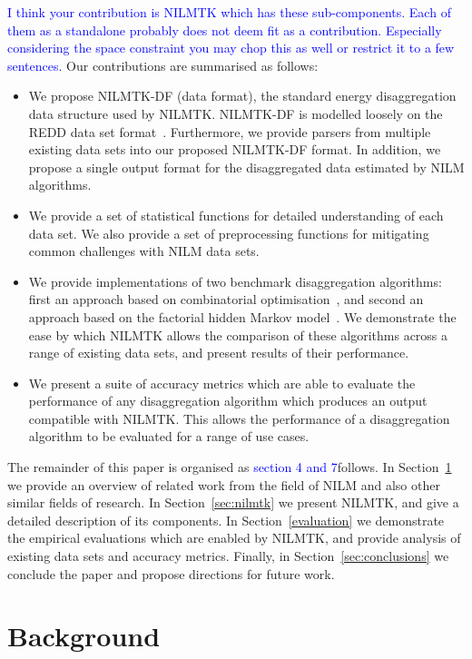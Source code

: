 \documentclass{sig-alternate}
\newcommand{\bluecolor}[1]{\textcolor{blue}{#1}}
\newcommand{\secref}[1]{Section~\ref{#1}}
\begin{document}
\bluecolor{I think your contribution is NILMTK which has these sub-components. Each of them as a standalone probably does not deem fit as a contribution. Especially considering the space constraint you may chop this as well or restrict it to a few sentences. }Our contributions are summarised as follows:
\begin{itemize}
\item We propose NILMTK-DF (data format), the standard energy disaggregation data structure used by NILMTK.  NILMTK-DF is modelled loosely on the REDD data set format~\cite{redd}. Furthermore, we provide parsers from multiple existing data sets into our proposed NILMTK-DF format. In addition, we propose a single output format for the disaggregated data estimated by NILM algorithms.
\item We provide a set of statistical functions for detailed understanding of each data set.  We also provide a set of preprocessing functions for mitigating common challenges with NILM data sets.
\item We provide implementations of two benchmark disaggregation algorithms: first an approach based on combinatorial optimisation~\cite{hart_1992}, and second an approach based on the factorial hidden Markov model~\cite{REDD,kim_2011}. We demonstrate the ease by which NILMTK allows the comparison of these algorithms across a range of existing data sets, and present results of their performance.
\item We present a suite of accuracy metrics which are able to evaluate the performance of any disaggregation algorithm which produces an output compatible with NILMTK. This allows the performance of a disaggregation algorithm to be evaluated for a range of use cases.
\end{itemize}

The remainder of this paper is organised as \bluecolor{section 4 and 7}follows. In \secref{sec:related} we provide an overview of related work from the field of NILM and also other similar fields of research. In \secref{sec:nilmtk} we present NILMTK, and give a detailed description of its components. In \secref{evaluation} we demonstrate the empirical evaluations which are enabled by NILMTK, and provide analysis of existing data sets and accuracy metrics. Finally, in \secref{sec:conclusions} we conclude the paper and propose directions for future work.

\section{Background}
\label{sec:related}
\end{document}
